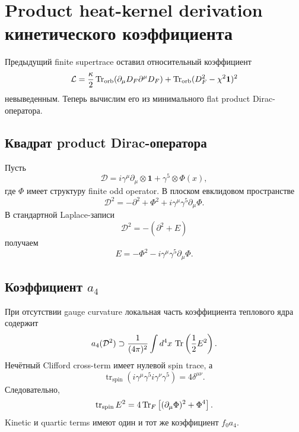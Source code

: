 \chapter{Product heat-kernel derivation кинетического коэффициента}

Предыдущий finite supertrace оставил относительный коэффициент
\begin{equation}
 \mathcal L
 =\frac{\kappa}{2}
 \operatorname{Tr}_{\mathrm{orb}}(\partial_\mu D_F\partial^\mu D_F)
 +\operatorname{Tr}_{\mathrm{orb}}(D_F^2-\chi^2\mathbf1)^2
\end{equation}
невыведенным. Теперь вычислим его из минимального flat product
Dirac-оператора.

\section{Квадрат product Dirac-оператора}

Пусть
\begin{equation}
 \mathcal D
 =i\gamma^\mu\partial_\mu\otimes\mathbf1
 +\gamma^5\otimes\Phi(x),
\end{equation}
где \(\Phi\) имеет структуру finite odd operator. В плоском евклидовом
пространстве
\begin{equation}
 \mathcal D^2
 =-\partial^2+\Phi^2
 +i\gamma^\mu\gamma^5\partial_\mu\Phi.
\end{equation}
В стандартной Laplace-записи
\begin{equation}
 \mathcal D^2=-(\partial^2+E)
\end{equation}
получаем
\begin{equation}
 E=-\Phi^2-i\gamma^\mu\gamma^5\partial_\mu\Phi.
\end{equation}

\section{Коэффициент \(a_4\)}

При отсутствии gauge curvature локальная часть коэффициента теплового
ядра содержит
\begin{equation}
 a_4(\mathcal D^2)
 \supset
 \frac1{(4\pi)^2}
 \int d^4x\,
 \operatorname{Tr}\left(\frac12E^2\right).
\end{equation}
Нечётный Clifford cross-term имеет нулевой spin trace, а
\begin{equation}
 \operatorname{tr}_{\mathrm{spin}}
 \left(
 i\gamma^\mu\gamma^5
 i\gamma^\nu\gamma^5
 \right)
 =4\delta^{\mu\nu}.
\end{equation}
Следовательно,
\begin{equation}
 \operatorname{tr}_{\mathrm{spin}}E^2
 =4\operatorname{Tr}_F
 \left[
 (\partial_\mu\Phi)^2+\Phi^4
 \right].
\end{equation}
Kinetic и quartic terms имеют один и тот же коэффициент \(f_0a_4\).

